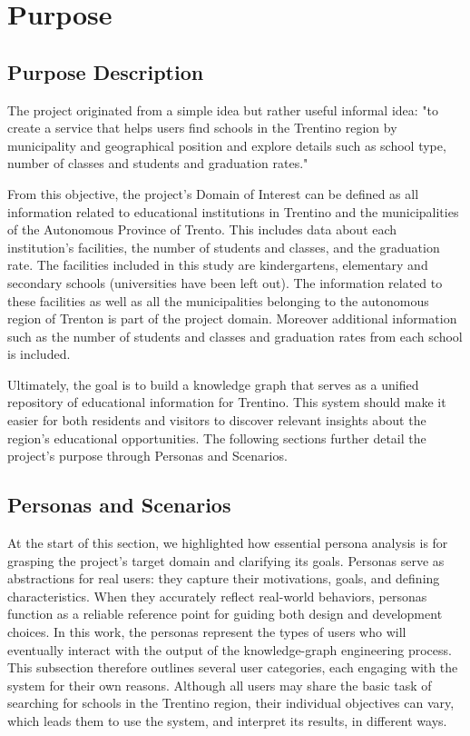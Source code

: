 
\section{Purpose}



\subsection{Purpose Description}
The project originated from a simple idea but rather useful informal idea:
"to create a service that helps users find schools in the Trentino region by municipality and geographical position and explore details such as school type, number of classes and students and graduation rates."

From this objective, the project's Domain of Interest can be defined as all information related to educational institutions in Trentino and the municipalities of the Autonomous Province of Trento. This includes data about each institution’s facilities, the number of students and classes, and the graduation rate.
The facilities included in this study are kindergartens, elementary and secondary schools (universities have been left out). The information related to these facilities as well as all the municipalities belonging to the autonomous region of Trenton is part of the project domain.
Moreover additional information such as the number of students and classes and graduation rates from each school is included.

Ultimately, the goal is to build a knowledge graph that serves as a unified repository of educational information for Trentino. This system should make it easier for both residents and visitors to discover relevant insights about the region’s educational opportunities.
The following sections further detail the project’s purpose through Personas and Scenarios.

\subsection{Personas and Scenarios}
At the start of this section, we highlighted how essential persona analysis is for grasping the project’s target domain and clarifying its goals. Personas serve as abstractions for real users: they capture their motivations, goals, and defining characteristics. When they accurately reflect real-world behaviors, personas function as a reliable reference point for guiding both design and development choices.
In this work, the personas represent the types of users who will eventually interact with the output of the knowledge-graph engineering process. This subsection therefore outlines several user categories, each engaging with the system for their own reasons. Although all users may share the basic task of searching for schools in the Trentino region, their individual objectives can vary, which leads them to use the system, and interpret its results, in different ways.

